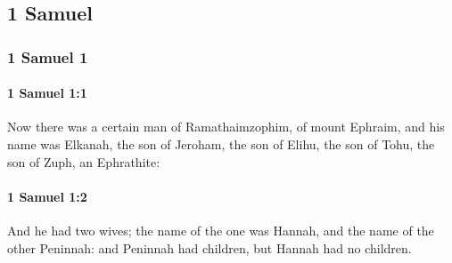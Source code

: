 \subsection{1 Samuel}
	\label{1SAMUEL}

	\subsubsection{1 Samuel 1} %
		\label{1SAMUEL-1}

		\paragraph{1 Samuel 1:1} %
			\label{1SAMUEL-1-1}

			Now there was a certain man of Ramathaimzophim, of mount Ephraim, and his name was Elkanah, the son of Jeroham, the son of Elihu, the son of Tohu, the son of Zuph, an Ephrathite:


		\paragraph{1 Samuel 1:2} %
			\label{1SAMUEL-1-2}

			And he had two wives; the name of the one was Hannah, and the name of the other Peninnah: and Peninnah had children, but Hannah had no children.


